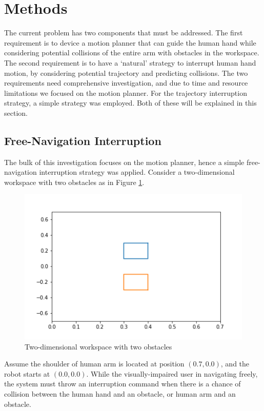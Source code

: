 \section{Methods}
The current problem has two components that must be addressed. 
The first requirement is to device a motion planner that can guide the human hand while considering potential collisions of the entire arm with obstacles in the workspace. 
The second requirement is to have a `natural' strategy to interrupt human hand motion, by considering potential trajectory and predicting collisions. 
The two requirements need comprehensive investigation, and due to time and resource limitations we focused on the motion planner. 
For the trajectory interruption strategy, a simple strategy was employed. 
Both of these will be explained in this section. 

\subsection{Free-Navigation Interruption}
The bulk of this investigation focuses on the motion planner, hence a simple free-navigation interruption strategy was applied. 
Consider a two-dimensional workspace with two obstacles as in Figure \ref{fig:exampleWorkspace}.  
\begin{figure}
    \centering
    \includegraphics[width = \linewidth]{img/obstacles.png}
    \caption{Two-dimensional workspace with two obstacles}
    \label{fig:exampleWorkspace}
\end{figure}
Assume the shoulder of human arm is located at position $(0.7,0.0)$, and the robot starts at $(0.0,0.0)$. 
While the visually-impaired user in navigating freely, the system must throw an interruption command when there is a chance of collision between the human hand and an obstacle, or human arm and an obstacle. 

